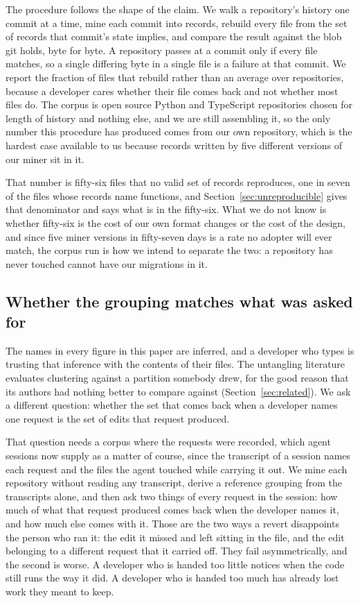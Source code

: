 The procedure follows the shape of the claim. We walk a repository's history one
commit at a time, mine each commit into records, rebuild every file from the set of
records that commit's state implies, and compare the result against the blob git
holds, byte for byte. A repository passes at a commit only if every file matches, so a
single differing byte in a single file is a failure at that commit. We report
the fraction of files that rebuild rather than an average over repositories, because a
developer cares whether their file comes back and not whether most files do. The
corpus is open source Python and TypeScript repositories chosen for length of history
and nothing else, and we are still assembling it, so the only number this procedure has
produced comes from our own repository, which is the hardest case available to us
because records written by five different versions of our miner sit in it.

That number is fifty-six files that no valid set of records reproduces, one in seven of
the files whose records name functions, and Section~\ref{sec:unreproducible} gives that
denominator and says what is in the fifty-six. What we do not know is whether
fifty-six is the cost of our own format changes or the cost of the design, and since
five miner versions in fifty-seven days is a rate no adopter will ever match, the
corpus run is how we intend to separate the two: a repository \sgt{} has never touched
cannot have our migrations in it.

\subsection{Whether the grouping matches what was asked for}

The names in every figure in this paper are inferred, and a developer who types
 is trusting that inference with the contents of
their files. The untangling literature evaluates clustering against a partition
somebody drew, for the good reason that its authors had nothing better to
compare against (Section~\ref{sec:related}). We ask a different question: whether
the set that comes back when a developer names one request is the set of edits
that request produced.

That question needs a corpus where the requests were recorded, which agent sessions
now supply as a matter of course, since the transcript of a session names each request
and the files the agent touched while carrying it out. We mine each repository without
reading any transcript, derive a reference grouping from the transcripts alone, and
then ask two things of every request in the session: how much of what that request
produced comes back when the developer names it, and how much else comes with it.
Those are the two ways a revert disappoints the person who ran it: the edit it missed
and left sitting in the file, and the edit belonging to a different request that it
carried off. They fail asymmetrically, and the second is worse. A
developer who is handed too little notices when the code still runs the way it did. A
developer who is handed too much has already lost work they meant to keep.

